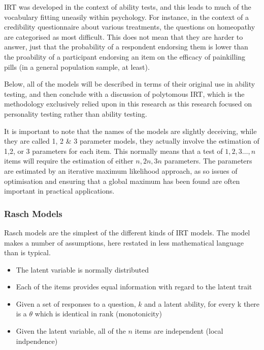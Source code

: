 IRT was developed in the context of ability tests, and this leads to much of the vocabulary fitting uneasily within psychology. For instance, in the context of a credibility questionnaire about various treatments, the questions on homeopathy are categorised as most difficult. This does not mean that they are harder to answer, just that the probability of a respondent endorsing them is lower than the proability of a participant endorsing an item on the efficacy of painkilling pills (in a general population sample, at least). 

Below, all of the models will be described in terms of their original use in ability testing, and then conclude with a discussion of polytomous IRT, which is the methodology exclusively relied upon in this research as this research focused on personality testing rather than ability testing.

It is important to note that the names of the models are slightly deceiving, while they are called 1, 2 \& 3 parameter models, they actually involve the estimation of 1,2, or 3 parameters for each item. This normally means that a test of ${1,2,3\ldots, n}$ items will require the estimation of either ${n, 2n, 3n}$ parameters. The parameters are estimated by an iterative maximum likelihood approach, as so issues of optimisation and ensuring that a global maximum has been found are often important in practical applications\cite{gill2002bayesian}. 


\subsubsection{Rasch Models}

Rasch models are the simplest of the different kinds of IRT models. The model makes a number of assumptions, here restated in less mathematical language than is typical\cite{fischer1995rasch}.

\begin{itemize}
\item The latent variable is normally distributed
\item Each of the items provides equal information with regard to the latent trait 
\item Given a set of responses to a question, $k$ and a latent ability, for every k there is a $\theta$ which is identical in rank (monotonicity)
\item Given the latent variable, all of the $n$ items are independent (local indpendence)
\end{itemize}


